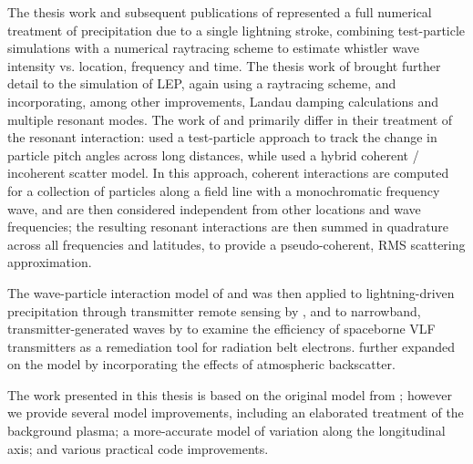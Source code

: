 The thesis work and subsequent publications of \citeauthor{Lauben1998} \citep{Lauben1998, Lauben1999, Lauben2001} represented a full numerical treatment of precipitation due to a single lightning stroke, combining test-particle simulations with a numerical raytracing scheme to estimate whistler wave intensity vs. location, frequency and time. The thesis work of \cite{Bortnik2005} brought further detail to the simulation of LEP, again using a raytracing scheme, and incorporating, among other improvements, Landau damping calculations and multiple resonant modes. The work of \citeauthor{Lauben1998} and \citeauthor{Bortnik2005} primarily differ in their treatment of the resonant interaction: \citeauthor{Lauben1998} used a test-particle approach to track the change in particle pitch angles across long distances, while \citeauthor{Bortnik2005} used a hybrid coherent / incoherent scatter model. In this approach, coherent interactions are computed for a collection of particles along a field line with a monochromatic frequency wave, and are then considered independent from other locations and wave frequencies; the resulting resonant interactions are then summed in quadrature across all frequencies and latitudes, to provide a pseudo-coherent, RMS scattering approximation.

The wave-particle interaction model of \cite{Bortnik2005} and \cite{Bortnik2006} was then applied to lightning-driven precipitation through transmitter remote sensing by \cite{Peter2007}, and to narrowband, transmitter-generated waves by \cite{Kulkarni2009} to examine the efficiency of spaceborne VLF transmitters as a remediation tool for radiation belt electrons. \cite{Cotts2011} further expanded on the \citeauthor{Bortnik2005} model by incorporating the effects of atmospheric backscatter.

The work presented in this thesis is based on the original model from \cite{Bortnik2005}; however we provide several model improvements, including an elaborated treatment of the background plasma; a more-accurate model of variation along the longitudinal axis; and various practical code improvements.

